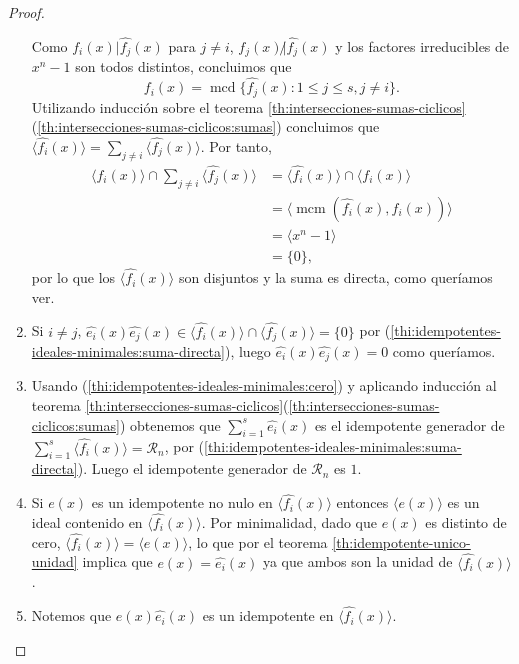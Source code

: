 \begin{proof}
\begin{enumerate}
    Como \(f_i(x) | \widehat{f_j}(x)\) para \(j \neq i\), \(f_j(x) \not| \widehat{f_j}(x)\) y los factores irreducibles de \(x^n - 1\) son todos distintos, concluimos que
    \[
      f_i(x) = \operatorname{mcd}\{\widehat{f_j}(x) : 1 \leq j \leq s, j \neq i\}.
    \]
    Utilizando inducción sobre el teorema \ref{th:intersecciones-sumas-ciclicos}(\ref{th:intersecciones-sumas-ciclicos:sumas}) concluimos que \(\langle \widehat{f_i}(x) \rangle = \sum_{j\neq i}\langle \widehat{f_j}(x) \rangle\).
    Por tanto, 
    \begin{align*}
      \langle \widehat{f_i}(x) \rangle \cap \sum_{j\neq i}\langle \widehat{f_j}(x) \rangle 
       &= \langle \widehat{f_i}(x) \rangle \cap \langle f_i(x) \rangle \\
       &= \langle\operatorname{mcm}(\widehat{f_i}(x), f_i(x))\rangle \\ 
       &= \langle x^n - 1\rangle \\
       &= \{0\},
    \end{align*}
    por lo que los \(\langle \widehat{f_i}(x) \rangle\) son disjuntos y la suma es directa, como queríamos ver.
    \item Si \(i \neq j\), \(\widehat{e_i}(x)\widehat{e_j}(x) \in \langle \widehat{f_i}(x) \rangle \cap \langle \widehat{f_j}(x) \rangle = \{0\}\) por (\ref{thi:idempotentes-ideales-minimales:suma-directa}), luego \(\widehat{e_i}(x)\widehat{e_j}(x) = 0\) como queríamos.
    \item Usando (\ref{thi:idempotentes-ideales-minimales:cero}) y aplicando inducción al teorema \ref{th:intersecciones-sumas-ciclicos}(\ref{th:intersecciones-sumas-ciclicos:sumas}) obtenemos que \(\sum_{i=1}^s \widehat{e_i}(x)\) es el idempotente generador de \(\sum_{i=1}^s \langle \widehat{f_i}(x) \rangle = \mathcal R_n\), por (\ref{thi:idempotentes-ideales-minimales:suma-directa}).
    Luego el idempotente generador de \(\mathcal R_n\) es \(1\).
    \item Si \(e(x)\) es un idempotente no nulo en \(\langle \widehat{f_i}(x) \rangle\) entonces \(\langle e(x) \rangle\) es un ideal contenido en \(\langle \widehat{f_i}(x) \rangle\).
    Por minimalidad, dado que \(e(x)\) es distinto de cero, \(\langle \widehat{f_i}(x) \rangle = \langle e(x)\rangle\), lo que por el teorema \ref{th:idempotente-unico-unidad} implica que \(e(x) = \widehat{e_i}(x)\) ya que ambos son la unidad de \(\langle \widehat{f_i}(x) \rangle\).
    \item Notemos que \(e(x)\widehat{e_i}(x)\) es un idempotente en  \(\langle \widehat{f_i}(x) \rangle\).

\end{enumerate}
\end{proof}
